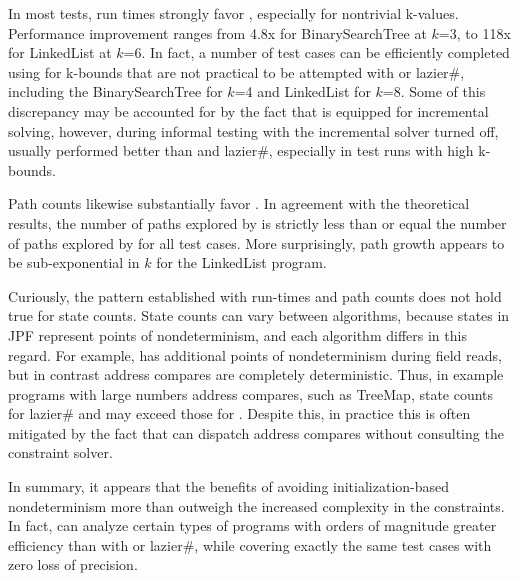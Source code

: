 In most tests, run times strongly favor \symtxt{}, especially for nontrivial k-values. Performance improvement ranges from 4.8x for BinarySearchTree at $k$=3, to 118x for LinkedList at $k$=6. In fact, a number of test cases can be efficiently completed using \symtxt{} for k-bounds that are not practical to be attempted with \gsetxt{} or lazier\#, including the BinarySearchTree for $k$=4 and LinkedList for $k$=8. Some of this discrepancy may be accounted for by the fact that \symtxt{} is equipped for incremental solving, however, during informal testing with the incremental solver turned off, \symtxt{} usually performed better than \gsetxt and lazier\#, especially in test runs with high k-bounds. 

Path counts likewise substantially favor \symtxt{}. In agreement with the theoretical results, the number of paths explored by \symtxt{} is strictly less than or equal the number of paths explored by \gsetxt{} for all test cases. More surprisingly, \symtxt{} path growth appears to be sub-exponential in $k$ for the LinkedList program.

Curiously, the pattern established with run-times and path counts does not hold true for state counts. State counts can vary between algorithms, because states in JPF represent points of nondeterminism, and each algorithm differs in this regard. For example, \gsetxt{} has additional points of nondeterminism during field reads, but in contrast address compares are completely deterministic. Thus, in example programs with large numbers address compares, such as TreeMap, state counts for lazier\# and \symtxt{} may exceed those for \gsetxt{}. Despite this, in practice this is often mitigated by the fact that \symtxt{} can dispatch address compares without consulting the constraint solver.

In summary, it appears that the benefits of avoiding initialization-based nondeterminism more than outweigh the increased complexity in the constraints. In fact, \symtxt{} can analyze certain types of programs with orders of magnitude greater efficiency than with \gsetxt{} or lazier#, while covering exactly the same test cases with zero loss of precision.